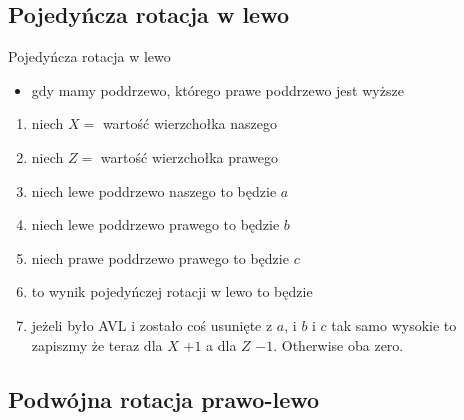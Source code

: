 \documentclass{beamer}
\begin{document}
\subsection{Pojedyńcza rotacja w lewo}
\begin{frame}{Pojedyńcza rotacja w lewo}
\begin{itemize}
\item gdy mamy poddrzewo, którego prawe poddrzewo jest wyższe
\end{itemize}
\begin{enumerate}
\item niech $X=$ wartość wierzchołka naszego
\item niech $Z=$ wartość wierzchołka prawego
\item niech lewe poddrzewo naszego to będzie $a$
\item niech lewe poddrzewo prawego to będzie $b$
\item niech prawe poddrzewo prawego to będzie $c$
\item to wynik pojedyńczej rotacji w lewo to będzie
\item \small jeżeli było AVL i zostało coś usunięte z $a$,
i $b$ i $c$ tak samo wysokie to zapiszmy
że teraz dla $X$ $+1$ a dla $Z$  $-1$. Otherwise oba zero.
\end{enumerate}
\end{frame}

\subsection{Podwójna rotacja prawo-lewo}
\end{document}
